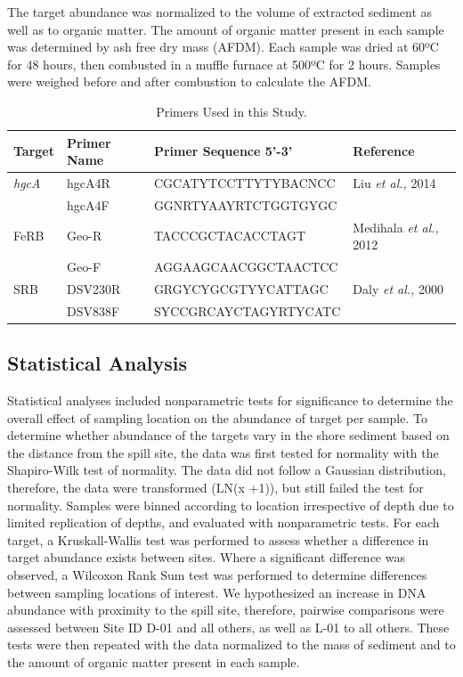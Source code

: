 \documentclass[ms, hidelinks]{uncgdissertationexp}
\theoremstyle{plain}
\theoremstyle{definition}
\theoremstyle{remark}
\begin{document}
The target abundance was normalized to the volume of extracted sediment as well as to organic matter. The amount of organic matter present in each sample was determined by ash free dry mass (AFDM). Each sample was dried at 60ºC for 48 hours, then combusted in a muffle furnace at 500ºC for 2 hours. Samples were weighed before and after combustion to calculate the AFDM.
\begin{table}[htbp]

\caption{\label{tab:primers} Primers Used in this Study.}
\centering
\begin{tabular}{llll}
\toprule
Target & Primer Name & Primer Sequence 5’-3’ & Reference\\
\midrule
\em{hgcA} & hgcA4R & CGCATYTCCTTYTYBACNCC & Liu \emph{et al.,} 2014\\
 & hgcA4F & GGNRTYAAYRTCTGGTGYGC & \\
FeRB & Geo-R & TACCCGCTACACCTAGT & Medihala \emph{et al.,} 2012\\
 & Geo-F & AGGAAGCAACGGCTAACTCC & \\
SRB & DSV230R & GRGYCYGCGTYYCATTAGC & Daly \emph{et al.,} 2000\\
 & DSV838F & SYCCGRCAYCTAGYRTYCATC & \\
\bottomrule
\end{tabular}
\end{table}
\hypertarget{statistical-analysis}{%
\subsection{Statistical Analysis}\label{statistical-analysis}}

Statistical analyses included nonparametric tests for significance to determine the overall effect of sampling location on the abundance of target per sample. To determine whether abundance of the targets vary in the shore sediment based on the distance from the spill site, the data was first tested for normality with the Shapiro-Wilk test of normality. The data did not follow a Gaussian distribution, therefore, the data were transformed (LN(x +1)), but still failed the test for normality. Samples were binned according to location irrespective of depth due to limited replication of depths, and evaluated with nonparametric tests. For each target, a Kruskall-Wallis test was performed to assess whether a difference in target abundance exists between sites. Where a significant difference was observed, a Wilcoxon Rank Sum test was performed to determine differences between sampling locations of interest. We hypothesized an increase in DNA abundance with proximity to the spill site, therefore, pairwise comparisons were assessed between Site ID D-01 and all others, as well as L-01 to all others. These tests were then repeated with the data normalized to the mass of sediment and to the amount of organic matter present in each sample.
\end{document}
